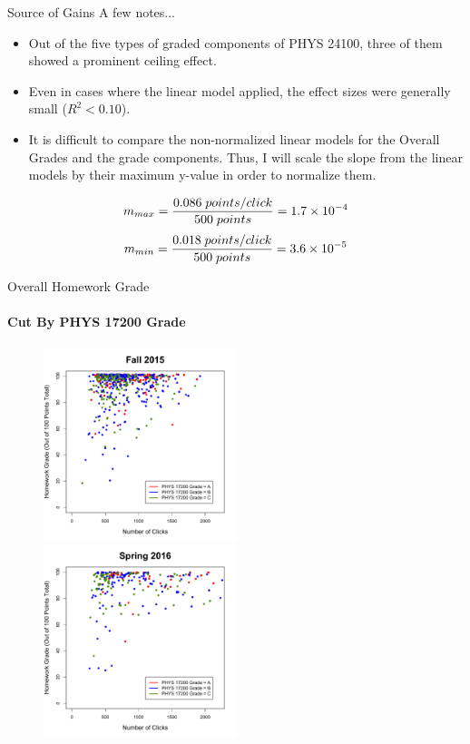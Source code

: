 \documentclass[xcolor=x11names,compress]{beamer}
\begin{document}
\begin{frame}{Source of Gains}
	A few notes...
	\begin{itemize}
		\item Out of the five types of graded components of PHYS 24100, three of them showed a prominent ceiling effect.
		\item Even in cases where the linear model applied, the effect sizes were generally small ($R^2 < 0.10$).
		\item It is difficult to compare the non-normalized linear models for the Overall Grades and the grade components. Thus, I will scale the slope from the linear models by their maximum y-value in order to normalize them.
	\end{itemize}
	\vspace{3mm}
	\begin{equation}
		m_{max} = \frac{0.086 \hspace{1mm} points/click}{500 \hspace{1mm}  points} = 1.7 \times 10^{-4}
	\end{equation}
	\begin{equation}
		m_{min} = \frac{0.018  \hspace{1mm} points/click}{500 \hspace{1mm}  points} = 3.6 \times 10^{-5}
	\end{equation}
\end{frame}

\begin{frame}{Overall Homework Grade}
	\framesubtitle{Cut By PHYS 17200 Grade}
	\begin{figure}
		\includegraphics[width=0.5\textwidth]{img/homework_fa15_172.pdf}
		\includegraphics[width=0.5\textwidth]{img/homework_sp16_172.pdf}
	\end{figure}
\end{frame}
\end{document}
